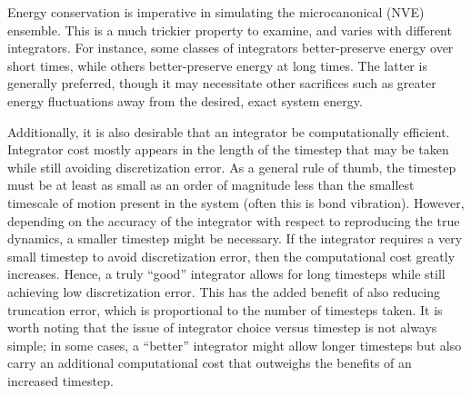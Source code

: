 \documentclass[9pt,bestpractices]{livecoms}
\begin{document}
Energy conservation is imperative in simulating the microcanonical (NVE) ensemble.
This is a much trickier property to examine, and varies with different integrators.
For instance, some classes of integrators better-preserve energy over short times, while others better-preserve energy at long times.
The latter is generally preferred, though it may necessitate other sacrifices such as greater energy fluctuations away from the desired, exact system energy.

Additionally, it is also desirable that an integrator be computationally efficient.
Integrator cost mostly appears in the length of the timestep that may be taken while still avoiding discretization error. 
As a general rule of thumb, the timestep must be at least as small as an order of magnitude less than the smallest timescale of motion present in the system (often this is bond vibration).
However, depending on the accuracy of the integrator with respect to reproducing the true dynamics, a smaller timestep might be necessary.
If the integrator requires a very small timestep to avoid discretization error, then the computational cost greatly increases.
Hence, a truly ``good'' integrator allows for long timesteps while still achieving low discretization error.
This has the added benefit of also reducing truncation error, which is proportional to the number of timesteps taken.
It is worth noting that the issue of integrator choice versus timestep is not always simple; in some cases, a ``better'' integrator might allow longer timesteps but also carry an additional computational cost that outweighs the benefits of an increased timestep.
\end{document}
